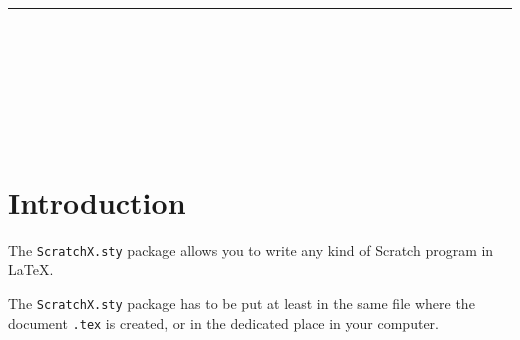 \documentclass[a4paper,11pt]{article}
\begin{document}
\pagestyle{fancy}
\fancyhead{}
		\fancyhead[LE,LO]{\em \LaTeX}
		\fancyfoot[CE,CO]{\thepage /\pageref{LastPage}}


\section*{
}
\begin{center}
\begin{Scratch}
\end{Scratch}
\end{center}

\noindent\rule{\linewidth}{.5pt}


\parbox{1ex}{\Scratchy[0.1][0.1]}\\

\hspace{1cm}\parbox{1ex}{\Scratchy[0.2][0.2]}\\

\hspace{2cm}\parbox{1ex}{\Scratchy[0.5][1]}\\

\hspace{5cm}\parbox{1ex}{\Scratchy[0.75][1.5]}\\

\section{Introduction}
The \texttt{ScratchX.sty} package allows you to write any kind of Scratch program in \LaTeX.

The \texttt{ScratchX.sty} package has to be put at least in the same file where the document \texttt{.tex} is created, or in the dedicated place in your computer.
\end{document}
